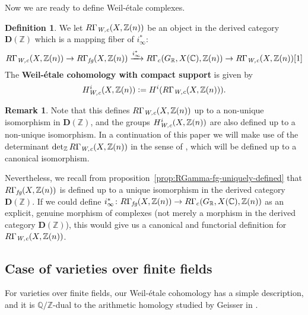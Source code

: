 \documentclass[leqno,12pt]{article}
\theoremstyle{plain}
\theoremstyle{definition}
\newtheorem{definition}[theorem]{\indent\sc Definition}
\newtheorem{remark}[theorem]{\indent\sc Remark}
\newcommand{\CC}{\mathbb{C}}
\newcommand{\QQ}{\mathbb{Q}}
\newcommand{\RR}{\mathbb{R}}
\newcommand{\ZZ}{\mathbb{Z}}
\newcommand{\dfn}{\mathrel{\mathop:}=}
\newcommand{\Wc}{\text{\it W,c}}
\newcommand{\fg}{\text{\it fg}}
\begin{document}
Now we are ready to define Weil-\'{e}tale complexes.

\begin{definition}
  \label{dfn:RGammaWc}
  We let
  $R\Gamma_\Wc (X,\ZZ(n))$ be an object in the derived category
  $\mathbf{D} (\ZZ)$ which is a mapping fiber of $i_\infty^*$:
  \[ R\Gamma_\Wc (X,\ZZ(n)) \to
  R\Gamma_\fg (X, \ZZ (n)) \xrightarrow{i_\infty^*}
  R\Gamma_c (G_\RR, X (\CC), \ZZ (n)) \to
  R\Gamma_\Wc (X,\ZZ(n)) [1] \]
  The \textbf{Weil-\'{e}tale cohomology with compact support} is given by
  $$H_\Wc^i (X, \ZZ (n)) \dfn H^i (R\Gamma_\Wc (X,\ZZ(n))).$$
\end{definition}

\begin{remark}
  Note that this defines $R\Gamma_\Wc (X,\ZZ(n))$ up to a non-unique isomorphism
  in $\mathbf{D} (\ZZ)$, and the groups $H_\Wc^i (X, \ZZ (n))$ are also defined
  up to a non-unique isomorphism. In a continuation of this paper we will make
  use of the determinant $\det\nolimits_\ZZ R\Gamma_\Wc (X,\ZZ(n))$ in the
  sense of \cite{Knudsen-Mumford-1976}, which will be defined up to a canonical
  isomorphism.

  Nevertheless, we recall from proposition~\ref{prop:RGamma-fg-uniquely-defined}
  that $R\Gamma_\fg (X, \ZZ (n))$ is defined up to a unique isomorphism in the
  derived category $\mathbf{D} (\ZZ)$. If we could define
  $i_\infty^*\colon R\Gamma_\fg (X, \ZZ(n)) \to R\Gamma_c (G_\RR, X(\CC), \ZZ(n))$
  as an explicit, genuine morphism of complexes (not merely a morphism in the
  derived category $\mathbf{D} (\ZZ)$), this would give us a canonical and
  functorial definition for $R\Gamma_\Wc (X, \ZZ(n))$.
\end{remark}

\subsection*{Case of varieties over finite fields}

For varieties over finite fields, our Weil-\'{e}tale cohomology has a simple
description, and it is $\QQ/\ZZ$-dual to the arithmetic homology studied by
Geisser in \cite{Geisser-2010-arithmetic-homology}.
\end{document}
